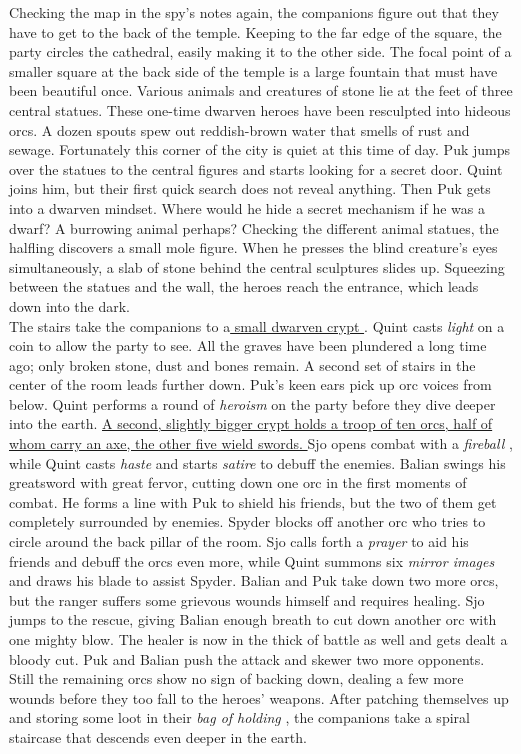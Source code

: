 Checking the map in the spy's notes again, the companions figure out that they have to get to the back of the temple. Keeping to the far edge of the square, the party circles the cathedral, easily making it to the other side. The focal point of a smaller square at the back side of the temple is a large fountain that must have been beautiful once. Various animals and creatures of stone lie at the feet of three central statues. These one-time dwarven heroes have been resculpted into hideous orcs. A dozen spouts spew out reddish-brown water that smells of rust and sewage. Fortunately this corner of the city is quiet at this time of day. Puk jumps over the statues to the central figures and starts looking for a secret door. Quint joins him, but their first quick search does not reveal anything. Then Puk gets into a dwarven mindset. Where would he hide a secret mechanism if he was a dwarf? A burrowing animal perhaps? Checking the different animal statues, the halfling discovers a small mole figure. When he presses the blind creature's eyes simultaneously, a slab of stone behind the central sculptures slides up. Squeezing between the statues and the wall, the heroes reach the entrance, which leads down into the dark.\\

The stairs take the companions to a\hyperref[fig:Urgir-tomb-Level-1-594710874]{ small dwarven crypt } . Quint casts  {\itshape light} on a coin to allow the party to see. All the graves have been plundered a long time ago; only broken stone, dust and bones remain. A second set of stairs in the center of the room leads further down. Puk's keen ears pick up orc voices from below. Quint performs a round of  {\itshape heroism} on the party before they dive deeper into the earth. \hyperref[fig:Urgir-tomb-Level-2-594712324]{ A second, slightly bigger crypt holds a troop of ten orcs, half of whom carry an axe, the other five wield swords. } Sjo opens combat with a  {\itshape fireball} , while Quint casts  {\itshape haste} and starts  {\itshape satire} to debuff the enemies. Balian swings his greatsword with great fervor, cutting down one orc in the first moments of combat. He forms a line with Puk to shield his friends, but the two of them get completely surrounded by enemies. Spyder blocks off another orc who tries to circle around the back pillar of the room. Sjo calls forth a  {\itshape prayer} to aid his friends and debuff the orcs even more, while Quint summons six  {\itshape mirror images} and draws his blade to assist Spyder. Balian and Puk take down two more orcs, but the ranger suffers some grievous wounds himself and requires healing. Sjo jumps to the rescue, giving Balian enough breath to cut down another orc with one mighty blow. The healer is now in the thick of battle as well and gets dealt a bloody cut. Puk and Balian push the attack and skewer two more opponents. Still the remaining orcs show no sign of backing down, dealing a few more wounds before they too fall to the heroes' weapons. After patching themselves up and storing some loot in their  {\itshape bag of holding} , the companions take a spiral staircase that descends even deeper in the earth. \\

